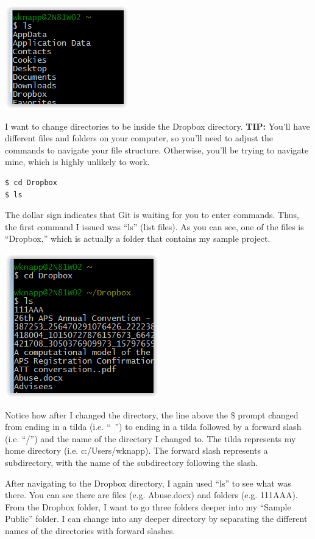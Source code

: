 \documentclass[12pt]{article}
\begin{document}
\includegraphics{imgs/Git03.PNG}

I want to change directories to be inside the Dropbox directory. \textbf{TIP:} You'll have
different files and folders on your computer, so you'll need to adjust the commands to
navigate your file structure. Otherwise, you'll be trying to navigate mine, which is
highly unlikely to work.

\begin{verbatim}
$ cd Dropbox
$ ls
\end{verbatim}

The dollar sign indicates that Git is waiting for you to enter commands. Thus, the 
first command I issued was ``ls'' (list files). As you can see, one of the files is
``Dropbox,'' which is actually a folder that contains my sample project.

\includegraphics{imgs/Git04.PNG}

Notice how after I changed the directory, the line above the \$ prompt changed from
ending in a tilda (i.e. ``~'') to ending in a tilda followed by a forward slash (i.e.
``/'') and the name of the directory I changed to. The tilda represents my home
directory (i.e. c:/Users/wknapp). The forward slash represents a subdirectory, with
the name of the subdirectory following the slash.

After navigating to the Dropbox directory, I again used ``ls'' to see what was there.
You can see there are files (e.g. Abuse.docx) and folders (e.g. 111AAA). From the Dropbox
folder, I want to go three folders deeper into my ``Sample Public'' folder. I can change
into any deeper directory by separating the different names of the directories with
forward slashes.
\end{document}
